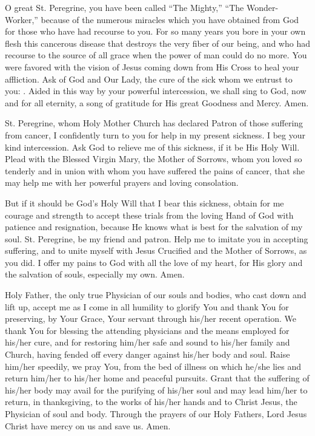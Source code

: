O great St. Peregrine, you have been called ``The Mighty,'' ``The Wonder-Worker,'' because of the numerous miracles which you have obtained from God for those who have had recourse to you.
For so many years you bore in your own flesh this cancerous disease that destroys the very fiber of our being, and who had recourse to the source of all grace when the power of man could do no more.
You were favored with the vision of Jesus coming down from His Cross to heal your affliction.
Ask of God and Our Lady, the cure of the sick whom we entrust to you: \insertname.
Aided in this way by your powerful intercession, we shall sing to God, now and for all eternity, a song of gratitude for His great Goodness and Mercy.
Amen.

St. Peregrine, whom Holy Mother Church has declared Patron of those suffering from cancer, I confidently turn to you for help in my present sickness.
I beg your kind intercession.
Ask God to relieve me of this sickness, if it be His Holy Will.
Plead with the Blessed Virgin Mary, the Mother of Sorrows, whom you loved so tenderly and in union with whom you have suffered the pains of cancer, that she may help me with her powerful prayers and loving consolation.

But if it should be God's Holy Will that I bear this sickness, obtain for me courage and strength to accept these trials from the loving Hand of God with patience and resignation, because He knows what is best for the salvation of my soul.
St. Peregrine, be my friend and patron.
Help me to imitate you in accepting suffering, and to unite myself with Jesus Crucified and the Mother of Sorrows, as you did.
I offer my pains to God with all the love of my heart, for His glory and the salvation of souls, especially my own.
Amen.

Holy Father, the only true Physician of our souls and bodies, who cast down and lift up, accept me as I come in all humility to glorify You and thank You for preserving, by Your Grace, Your servant \insertname through his/her recent operation.
We thank You for blessing the attending physicians and the means employed for his/her cure, and for restoring him/her safe and sound to his/her family and Church, having fended off every danger against his/her body and soul.
Raise him/her speedily, we pray You, from the bed of illness on which he/she lies and return him/her to his/her home and peaceful pursuits.
Grant that the suffering of his/her body may avail for the purifying of his/her soul and may lead him/her to return, in thanksgiving, to the works of his/her hands and to Christ Jesus, the Physician of soul and body.
Through the prayers of our Holy Fathers, Lord Jesus Christ have mercy on us and save us.
Amen.

